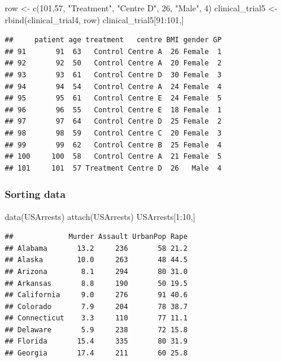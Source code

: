 \documentclass[]{article}
\newenvironment{Shaded}{\begin{snugshade}}{\end{snugshade}}
\newcommand{\DecValTok}[1]{\textcolor[rgb]{0.00,0.00,0.81}{#1}}
\newcommand{\FunctionTok}[1]{\textcolor[rgb]{0.00,0.00,0.00}{#1}}
\newcommand{\NormalTok}[1]{#1}
\newcommand{\OtherTok}[1]{\textcolor[rgb]{0.56,0.35,0.01}{#1}}
\newcommand{\SpecialCharTok}[1]{\textcolor[rgb]{0.00,0.00,0.00}{#1}}
\newcommand{\StringTok}[1]{\textcolor[rgb]{0.31,0.60,0.02}{#1}}
\begin{document}
\begin{Shaded}
\begin{Highlighting}[]
\NormalTok{row }\OtherTok{\textless{}{-}} \FunctionTok{c}\NormalTok{(}\DecValTok{101}\NormalTok{,}\DecValTok{57}\NormalTok{, }\StringTok{"Treatment"}\NormalTok{, }\StringTok{"Centre D"}\NormalTok{, }\DecValTok{26}\NormalTok{, }\StringTok{"Male"}\NormalTok{, }\DecValTok{4}\NormalTok{)}
\NormalTok{clinical\_trial5 }\OtherTok{\textless{}{-}} \FunctionTok{rbind}\NormalTok{(clinical\_trial4, row)}
\NormalTok{clinical\_trial5[}\DecValTok{91}\SpecialCharTok{:}\DecValTok{101}\NormalTok{,]}
\end{Highlighting}
\end{Shaded}

\begin{verbatim}
##     patient age treatment   centre BMI gender GP
## 91       91  63   Control Centre A  26 Female  1
## 92       92  50   Control Centre A  20 Female  2
## 93       93  61   Control Centre D  30 Female  3
## 94       94  54   Control Centre A  24 Female  4
## 95       95  61   Control Centre E  24 Female  5
## 96       96  55   Control Centre E  18 Female  1
## 97       97  64   Control Centre D  25 Female  2
## 98       98  59   Control Centre C  20 Female  3
## 99       99  62   Control Centre B  25 Female  4
## 100     100  58   Control Centre A  21 Female  5
## 101     101  57 Treatment Centre D  26   Male  4
\end{verbatim}

\hypertarget{sorting-data}{%
\subsubsection{Sorting data}\label{sorting-data}}

\begin{Shaded}
\begin{Highlighting}[]
\FunctionTok{data}\NormalTok{(USArrests)}
\FunctionTok{attach}\NormalTok{(USArrests)}
\NormalTok{USArrests[}\DecValTok{1}\SpecialCharTok{:}\DecValTok{10}\NormalTok{,]}
\end{Highlighting}
\end{Shaded}

\begin{verbatim}
##             Murder Assault UrbanPop Rape
## Alabama       13.2     236       58 21.2
## Alaska        10.0     263       48 44.5
## Arizona        8.1     294       80 31.0
## Arkansas       8.8     190       50 19.5
## California     9.0     276       91 40.6
## Colorado       7.9     204       78 38.7
## Connecticut    3.3     110       77 11.1
## Delaware       5.9     238       72 15.8
## Florida       15.4     335       80 31.9
## Georgia       17.4     211       60 25.8
\end{verbatim}
\end{document}
